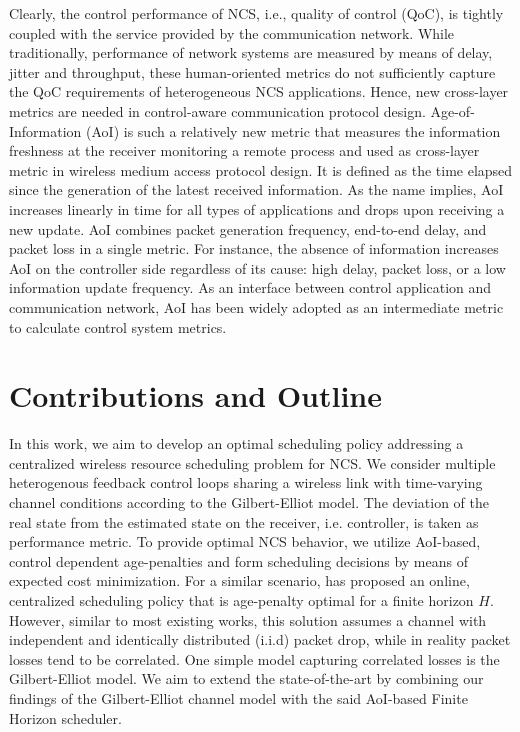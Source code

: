 Clearly, the control performance of NCS, i.e., quality of control (QoC), is
tightly coupled with the service provided by the communication network. While
traditionally, performance of network systems are measured by means of delay,
jitter and throughput, these human-oriented metrics do not sufficiently capture
the QoC requirements of heterogeneous NCS applications. Hence, new cross-layer
metrics are needed in control-aware communication protocol design.
Age-of-Information (AoI) is such a relatively new metric that measures the
information freshness at the receiver monitoring a remote process
\cite{kaul2012real} and used as cross-layer metric in wireless medium access
protocol design. It is defined as the time elapsed since the generation of the
latest received information. As the name implies, AoI increases linearly in time
for all types of applications and drops upon receiving a new update. AoI
combines packet generation frequency, end-to-end delay, and packet loss in a
single metric. For instance, the absence of information increases AoI on the
controller side regardless of its cause: high delay, packet loss, or a low
information update frequency. As an interface between control application and
communication network, AoI has been widely adopted as an intermediate metric to
calculate control system metrics. 


\section*{Contributions and Outline}
In this work, we aim to develop an optimal scheduling policy addressing a
centralized wireless resource scheduling problem for NCS. We consider multiple
heterogenous feedback control loops sharing a wireless link with time-varying
channel conditions according to the Gilbert-Elliot model. The deviation of the
real state from the estimated state on the receiver, i.e. controller, is taken
as performance metric. To provide optimal NCS behavior, we utilize AoI-based,
control dependent age-penalties and form scheduling decisions by means of
expected cost minimization. For a similar scenario, \cite{ayan2020aoi} has
proposed an online, centralized scheduling policy that is age-penalty optimal
for a finite horizon $H$. However, similar to most existing works, this solution
assumes a channel with independent and identically distributed (i.i.d) packet
drop, while in reality packet losses tend to be correlated. One simple model
capturing correlated losses is the Gilbert-Elliot model. We aim to extend the
state-of-the-art by combining our findings of the Gilbert-Elliot channel model
with the said AoI-based Finite Horizon scheduler.

